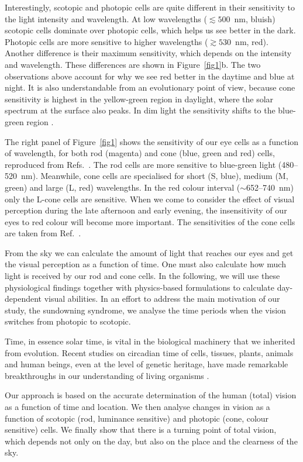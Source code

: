 \documentclass[brainsci,article,submit,moreauthors]{Definitions/mdpi}
\begin{document}
Interestingly, scotopic and photopic cells are quite different in their sensitivity to the light intensity and wavelength. At low wavelengths ($\lesssim 500$~nm, bluish) scotopic cells dominate over photopic cells, which helps us see better in the dark. Photopic cells are more sensitive to higher wavelengths ($\gtrsim 530$~nm, red). Another difference is their maximum sensitivity, which depends on the intensity and wavelength. These differences are shown in Figure~\ref{fig1}b. The two observations above account for why we see red better in the daytime and blue at night. It is also understandable from an evolutionary point of view, because cone sensitivity is highest in the yellow-green region in daylight, where the solar spectrum at the surface also peaks. In dim light the sensitivity shifts to the blue-green region \citep{boynton1979}.

The right panel of Figure~\ref{fig1} shows the sensitivity of our eye cells as a function of wavelength, for both rod (magenta) and cone (blue, green and red) cells, reproduced from Refs.~\citep{kraft1993,schnapf1987}. The rod cells are more sensitive to blue-green light (480--520~nm). Meanwhile, cone cells are specialised for short (S, blue), medium (M, green) and large (L, red) wavelengths. In the red colour interval ($\sim$652--740~nm) only the L-cone cells are sensitive. When we come to consider the effect of visual perception during the late afternoon and early evening, the insensitivity of our eyes to red colour will become more important. The sensitivities of the cone cells are taken from Ref.~\citep{stockman1993}.

From the sky we can calculate the amount of light that reaches our eyes and get the visual perception as a function of time. One must also calculate how much light is received by our rod and cone cells. In the following, we will use these physiological findings together with physics-based formulations to calculate day-dependent visual abilities. In an effort to address the main motivation of our study, the sundowning syndrome, we analyse the time periods when the vision switches from photopic to scotopic.

Time, in essence solar time, is vital in the biological machinery that we inherited from evolution. Recent studies on circadian time of cells, tissues, plants, animals and human beings, even at the level of genetic heritage, have made remarkable breakthroughs in our understanding of living organisms \citep{cao2021}.

Our approach is based on the accurate determination of the human (total) vision as a function of time and location. We then analyse changes in vision as a function of scotopic (rod, luminance sensitive) and photopic (cone, colour sensitive) cells. We finally show that there is a turning point of total vision, which depends not only on the day, but also on the place and the clearness of the sky.
\end{document}
